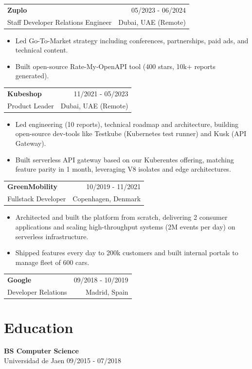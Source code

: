 \documentclass[10pt,a4paper]{article}
\makeatletter
\newcommand{\resumeSubheading}[4]{
    \vspace{4pt}
    \begin{tabular*}{\textwidth}{@{}l@{\extracolsep{\fill}}r@{}}
        \textbf{#1} & #2 \\
        #3 & #4
    \end{tabular*}
    \vspace{-4pt}
}
\makeatother
\begin{document}
\resumeSubheading
{Zuplo}{05/2023 - 06/2024}
{Staff Developer Relations Engineer}{Dubai, UAE (Remote)}

\begin{itemize}
    \item Led Go-To-Market strategy including conferences, partnerships, paid ads, and technical content.
    \item Built open-source Rate-My-OpenAPI tool (400 stars, 10k+ reports generated).
\end{itemize}

\resumeSubheading
{Kubeshop}{11/2021 - 05/2023}
{Product Leader}{Dubai, UAE (Remote)}

\begin{itemize}
    \item Led engineering (10 reports), technical roadmap and architecture, building open-source dev-tools like Testkube (Kubernetes test runner) and Kusk (API Gateway).
    \item Built serverless API gateway based on our Kuberentes offering, matching feature parity in 1 month, leveraging V8 isolates and edge architectures.
\end{itemize}

\resumeSubheading
{GreenMobility}{10/2019 - 11/2021}
{Fullstack Developer}{Copenhagen, Denmark}

\begin{itemize}
    \item Architected and built the platform from scratch, delivering 2 consumer applications and scaling high-throughput systems (2M events per day) on serverless infrastructure.
    \item Shipped features every day to 200k customers and built internal portals to manage fleet of 600 cars.
\end{itemize}

\resumeSubheading
{Google}{09/2018 - 10/2019}
{Developer Relations}{Madrid, Spain}


\section{Education}

\textbf{BS Computer Science} \\
Universidad de Jaen \hfill 09/2015 - 07/2018
\end{document}
